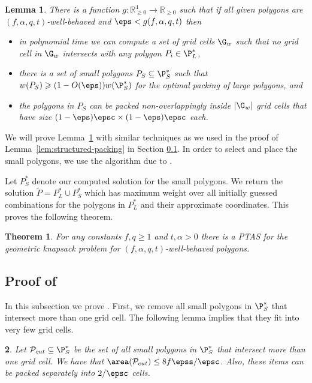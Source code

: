 \documentclass[10pt,a4paper]{article}
\newtheorem{theorem}{Theorem}[section]
\newtheorem{lemma}{Lemma}[section]
\theoremstyle{plain}
\theoremstyle{plain}
\newtheorem{lem}[theorem]{\protect\lemmaname}
\theoremstyle{plain}
\theoremstyle{definition}
\providecommand{\lemmaname}{Lemma}
\def\rem#1{{\marginpar{\raggedright\scriptsize #1}}}
\newcommand{\awr}[1]{\rem{\textcolor{orange}{$\bullet$ #1}}}
\begin{document}
{\begin{lemma}\label{lem:structured-packing-polygon}
	There is a function $g:\mathbb{R}^4_{\geqslant 0} \rightarrow \mathbb{R}_{\geqslant 0}$ such that if all given polygons are $(f,\alpha,q, t)$-well-behaved and $\eps < g(f,\alpha,q,t)$ then
	\begin{itemize}
	 \item in polynomial time we can compute a set of grid cells $\G_w$ such that no grid cell in $\G_w$ intersects with any
	polygon $P_i \in\P_{L}^{*}$,
	\item there is a set of small polygons $P_S \subseteq \P_{S}^*$ such that $w(P_{S}) \geqslant (1-O(\eps))w(\P_{S}^{*})$ for the optimal packing of large polygons, and
	\item the polygons in $P_S$ can be packed non-overlappingly inside $|\G_w|$ grid cells that have size
	\mbox{$(1-\eps) \epsc \times (1-\eps) \epsc$} each.
	\end{itemize}
\end{lemma}
We will prove Lemma~\ref{lem:structured-packing-polygon} {with similar techniques as we used in the proof of Lemma~\ref{lem:structured-packing}} in Section \ref{susec:smallpoly}.
In order to select and place the small polygons, we use the algorithm due to . 

{Let $P_S^*$ denote our computed solution for the small polygons.
We return the solution $\tilde P = P_L^* \cup P_S^*$ which has maximum weight over all initially guessed combinations for the polygons in $P_L^*$ and their approximate coordinates.}
This proves the following theorem. 

\begin{theorem} \label{thm:polygon} For any constants $f,q\ge1$ and $t,\alpha>0$ there is a
	\textsf{PTAS} for the geometric knapsack problem for \emph{$(f,\alpha,q, t)$-well-behaved} polygons.\end{theorem}



\subsection{Proof of }
\label{susec:smallpoly}
In this subsection we prove . First, we remove all small polygons in $\P_{S}^{*}$ that intersect more than one grid cell. The following lemma implies that they fit into very few grid cells.
\begin{lem}
	\label{lem: cut-polygon}
	Let $\mathcal{P}_{cut}\subseteq \P_{S}^{*}$ be the set of all small polygons in $\P_{S}^{*}$ that intersect more than one grid cell. We have that $\area(\mathcal{P}_{cut}) \le 8 f \epss/\epsc$. %
 Also, these items can be packed separately into $2/\epsc$ cells.
\end{lem}

}
\end{document}

